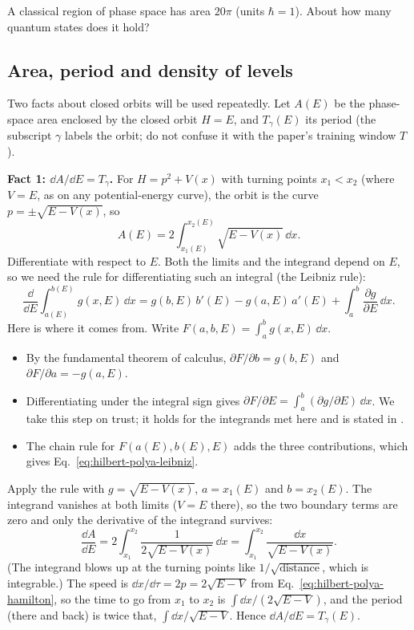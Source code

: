 \begin{checkpoint}
A classical region of phase space has area $20\pi$ (units $\hbar=1$). About how many quantum states does it hold?
\end{checkpoint}

\subsection{Area, period and density of levels}

Two facts about closed orbits will be used repeatedly. Let $A(E)$ be the phase-space area enclosed by the closed orbit $H=E$, and $T_\gamma(E)$ its period (the subscript $\gamma$ labels the orbit; do not confuse it with the paper's training window $T$).

\textbf{Fact 1: $\dd A/\dd E=T_\gamma$.} For $H=p^2+V(x)$ with turning points $x_1<x_2$ (where $V=E$, as on any potential-energy curve), the orbit is the curve $p=\pm\sqrt{E-V(x)}$, so
\begin{equation}
A(E)=2\int_{x_1(E)}^{x_2(E)}\sqrt{E-V(x)}\,\dd x .
\end{equation}
Differentiate with respect to $E$. Both the limits and the integrand depend on $E$, so we need the rule for differentiating such an integral (the Leibniz rule):
\begin{equation}
\frac{\dd}{\dd E}\int_{a(E)}^{b(E)}g(x,E)\,\dd x=g(b,E)\,b'(E)-g(a,E)\,a'(E)+\int_{a}^{b}\frac{\partial g}{\partial E}\,\dd x .
\label{eq:hilbert-polya-leibniz}
\end{equation}
Here is where it comes from. Write $F(a,b,E)=\int_a^b g(x,E)\,\dd x$.
\begin{itemize}
\item By the fundamental theorem of calculus, $\partial F/\partial b=g(b,E)$ and $\partial F/\partial a=-g(a,E)$.
\item Differentiating under the integral sign gives $\partial F/\partial E=\int_a^b(\partial g/\partial E)\,\dd x$. We take this step on trust; it holds for the integrands met here and is stated in \cite{rhb}.
\item The chain rule for $F(a(E),b(E),E)$ adds the three contributions, which gives Eq.~\eqref{eq:hilbert-polya-leibniz}.
\end{itemize}
Apply the rule with $g=\sqrt{E-V(x)}$, $a=x_1(E)$ and $b=x_2(E)$. The integrand vanishes at both limits ($V=E$ there), so the two boundary terms are zero and only the derivative of the integrand survives:
\begin{equation}
\frac{\dd A}{\dd E}=2\int_{x_1}^{x_2}\frac{1}{2\sqrt{E-V(x)}}\,\dd x=\int_{x_1}^{x_2}\frac{\dd x}{\sqrt{E-V(x)}} .
\end{equation}
(The integrand blows up at the turning points like $1/\sqrt{\text{distance}}$, which is integrable.) The speed is $\dd x/\dd \tau=2p=2\sqrt{E-V}$ from Eq.~\eqref{eq:hilbert-polya-hamilton}, so the time to go from $x_1$ to $x_2$ is $\int\dd x/(2\sqrt{E-V})$, and the period (there and back) is twice that, $\int\dd x/\sqrt{E-V}$. Hence $\dd A/\dd E=T_\gamma(E)$.

